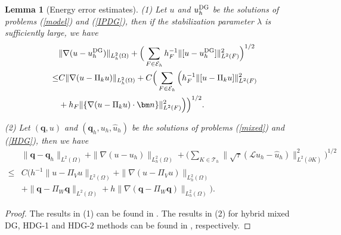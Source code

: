 \documentclass[1996/10/24]{amsart}
\newtheorem{lemma}[theorem]{Lemma}
\theoremstyle{definition}
\numberwithin{equation}{section}
\begin{document}
\begin{lemma}[Energy error estimates]\label{leee}
(1) Let $u$ and $u_h^{{\rm DG}}$ be the solutions of problems (\ref{model}) and (\ref{IPDG}), then if the stabilization parameter $\lambda$ is sufficiently large, we have
 \begin{align}
 &\|\nabla(u-u_h^{{\rm DG}})\|_{L_h^2(\Omega)}+\Big(\sum_{F\in\mathcal{E}_h}h_F^{-1}\|[u-u_h^{{\rm DG}}]\|^2_{L^2(F)}\Big)^{1/2}\nonumber\\
 \leq&C\|\nabla(u-\Pi_ku)\|_{L_h^2(\Omega)}+C\Big(\sum_{F\in\mathcal{E}_h}\Big(h_F^{-1}\|[u-\Pi_ku]\|^2_{L^2(F)}\\
 &+h_F\|\{\nabla(u-\Pi_ku)\cdot{\bm n}\}\|^2_{L^2(F)}\Big)\Big)^{1/2}.\nonumber
 \end{align}

(2) Let $({\bm q},u)$ and $({\bm q}_h,u_h,\widehat{u}_h)$ be the solutions of problems (\ref{mixed}) and (\ref{HDG}), then we have
\begin{align}
&\|{\bm q}-{\bm q}_h\|_{L^2(\Omega)}+\|\nabla(u-u_h)\|_{L^2_h(\Omega)}+\Big(\sum_{K\in\mathcal{T}_h}\|\sqrt{\tau}(\mathcal{L}u_h-\widehat{u}_h)\|^2_{L^2(\partial K)}\Big)^{1/2}\nonumber\\
\leq&C\Big(h^{-1}\|u-\Pi_Vu\|_{L^2(\Omega)}+\|\nabla(u-\Pi_Vu)\|_{L_h^2(\Omega)}\\
&+\|{\bm q}-\Pi_W{\bm q}\|_{L^2(\Omega)}+h\|\nabla({\bm q}-\Pi_W{\bm q})\|
_{L_h^2(\Omega)}\Big).\nonumber
\end{align}
\end{lemma}
\begin{proof}
The results in (1) can be found in \cite[Theorem 4.17]{de2011}. The results in (2) for hybrid mixed DG, HDG-1 and HDG-2 methods can be found in
\cite{cfq2018, es2010, qs2016}, respectively.
\end{proof}
\end{document}
